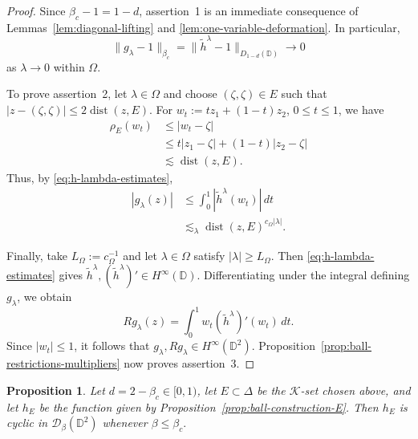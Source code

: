 \documentclass[a4paper,12pt]{amsart}
\newtheorem{prop}[thm]{Proposition}
\theoremstyle{definition}
\begin{document}
\begin{proof}
Since $\beta_c-1=1-d$, assertion~1 is an immediate consequence of
Lemmas~\ref{lem:diagonal-lifting} and
\ref{lem:one-variable-deformation}. In particular,
\[
    \|g_\lambda-1\|_{\beta_c}
    =
    \|\widetilde h^\lambda-1\|_{D_{1-d}(\mathbb D)}
    \longrightarrow0
\]
as $\lambda\to0$ within $\Omega$.

To prove assertion~2, let $\lambda\in\Omega$ and choose
$(\zeta,\zeta)\in E$ such that
$
    |z-(\zeta,\zeta)|
    \leq2\operatorname{dist}(z,E).
$
For $w_t:=tz_1+(1-t)z_2$, $0\leq t\leq1$, we have
\[
\begin{aligned}
    \rho_E(w_t)
    &\leq |w_t-\zeta|\\
    &\leq t|z_1-\zeta|+(1-t)|z_2-\zeta|\\
    &\lesssim\operatorname{dist}(z,E).
\end{aligned}
\]
Thus, by \eqref{eq:h-lambda-estimates},
\[
\begin{aligned}
    |g_\lambda(z)|
    &\leq
    \int_0^1|\widetilde h^\lambda(w_t)|\,dt\\
    &\lesssim_\lambda
    \operatorname{dist}(z,E)^{c_\Omega|\lambda|}.
\end{aligned}
\]

Finally, take $L_\Omega:=c_\Omega^{-1}$ and let
$\lambda\in\Omega$ satisfy $|\lambda|\geq L_\Omega$. Then \eqref{eq:h-lambda-estimates} gives
$
    \widetilde h^\lambda,
    (\widetilde h^\lambda)'
    \in H^\infty(\mathbb D).
$
Differentiating under the integral defining $g_\lambda$, we obtain
\[
    Rg_\lambda(z)
    =
    \int_0^1
    w_t(\widetilde h^\lambda)'(w_t)\,dt.
\]
Since $|w_t|\leq1$, it follows that
$
    g_\lambda,Rg_\lambda\in H^\infty(\mathbb D^2).
$
Proposition~\ref{prop:ball-restrictions-multipliers} now proves
assertion~3.
\end{proof}

\begin{prop}\label{prop:case2-cyclicity}
Let $d=2-\beta_c\in[0,1)$, let $E\subset\Delta$ be the
$\mathcal K$-set chosen above, and let $h_E$ be the function given by
Proposition~\ref{prop:ball-construction-E}. Then $h_E$ is cyclic in
$\mathcal D_\beta(\mathbb D^2)$ whenever
$
    \beta\leq\beta_c.
$
\end{prop}
\end{document}

